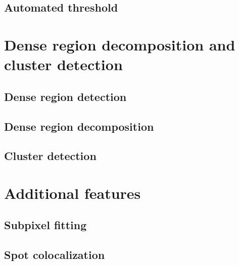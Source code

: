 \subsection{Automated threshold}


\section{Dense region decomposition and cluster detection}


\subsection{Dense region detection}

\subsection{Dense region decomposition}

\subsection{Cluster detection}


\section{Additional features}


\subsection{Subpixel fitting}

\subsection{Spot colocalization}

